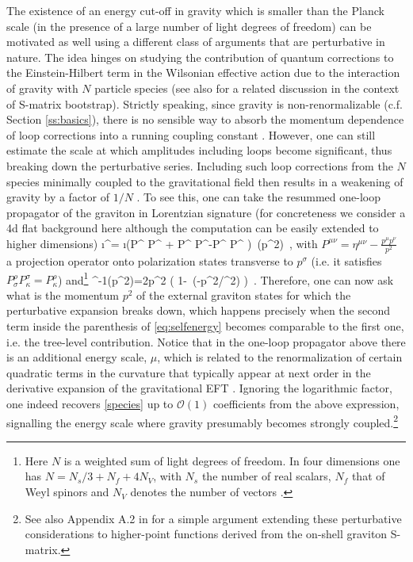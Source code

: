 The existence of an energy cut-off in gravity which is smaller than the Planck scale (in the presence of a large number of light degrees of freedom) can be motivated as well using a different class of arguments that are perturbative in nature. The idea hinges on studying the contribution of quantum corrections to the Einstein-Hilbert term in the Wilsonian effective action due to the interaction of gravity with $N$ particle species (see also \cite{Caron-Huot:2022ugt} for a related discussion in the context of S-matrix bootstrap). Strictly speaking, since gravity is non-renormalizable (c.f. Section \ref{ss:basics}), there is no sensible way to absorb the momentum dependence of loop corrections into a running coupling constant \cite{Anber:2011ut, Heidenreich:2017sim}. However, one can still estimate the scale at which amplitudes including loops become significant, thus breaking down the perturbative series. Including such loop corrections from the $N$ species minimally coupled to the gravitational field then results in a weakening of gravity by a factor of $1/N$ \cite{Donoghue:1994dn,Aydemir:2012nz,Anber:2011ut,Calmet:2017omb,Han:2004wt}. To see this, one can take the resummed one-loop propagator of the graviton in Lorentzian signature (for concreteness we consider a 4d flat background here although the computation can be easily extended to higher dimensions)
%
\beq \label{eq:gravitonpropagator}
	\i \Pi^{\mu \nu \rho \sigma}= \i \left(P^{\mu \rho} P^{\nu \sigma} + P^{\mu \sigma} P^{\nu \rho}-P^{\mu \nu} P^{\rho \sigma} \right)\, \pi(p^2)\ ,
\eeq
%
with $P^{\mu \nu}= \eta^{\mu \nu}-\frac{p^{\mu} p^{\nu}}{p^2}$ a projection operator onto polarization states transverse to $p^{\sigma}$ (i.e. it satisfies $P^{\rho}_{\sigma} P^{\sigma}_{\kappa}=P^{\rho}_{\kappa}$) and\footnote{Here $N$ is a weighted sum of light degrees of freedom. In four dimensions one has $N=N_s/3+N_f+4N_V$, with $N_s$ the number of real scalars, $N_f$ that of Weyl spinors and $N_V$ denotes the number of vectors \cite{Han:2004wt,Aydemir:2012nz}.}
%
\beq \label{eq:selfenergy}
	\pi^{-1}(p^2)=2p^2 \left( 1-\, \log (-p^2/\mu^2) \right )\, .
\eeq
%
Therefore, one can now ask what is the momentum $p^2$ of the external graviton states for which the perturbative expansion breaks down, which happens precisely when the second term inside the parenthesis of \eqref{eq:selfenergy} becomes comparable to the first one, i.e. the tree-level contribution. Notice that in the one-loop propagator above there is an additional energy scale, $\mu$, which is related to the renormalization of certain quadratic terms in the curvature that typically appear at next order in the derivative expansion of the gravitational EFT \cite{Aydemir:2012nz}. Ignoring the logarithmic factor, one indeed recovers \eqref{species} up to $\mathcal{O}(1)$ coefficients from the above expression, signalling the energy scale where gravity presumably becomes strongly coupled.\footnote{See also Appendix A.2 in \cite{Heidenreich:2017sim} for a simple argument extending these perturbative considerations to higher-point functions derived from the on-shell graviton S-matrix.}

